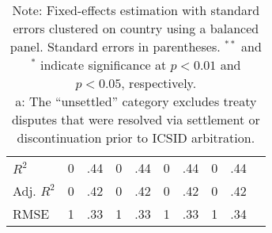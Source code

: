 \documentclass[12pt,onesided]{amsart}
\begin{document}
\begin{table}[ht]
\begin{tabular}{lr@{} lr@{}lr@{}lr@{}lr@{}}
  $R^{2}$ & 0&.44 & 0&.44 & 0&.44 & 0&.44 \\ 
  Adj. $R^{2}$ & 0&.42 & 0&.42 & 0&.42 & 0&.42 \\ 
  RMSE & 1&.33 & 1&.33 & 1&.33 & 1&.34 \\ 
   \hline
\hline
\end{tabular}
\caption*{Note: Fixed-effects estimation with standard errors clustered on country using a balanced panel. Standard errors in parentheses. $^{**}$ and $^{*}$ indicate significance at $p<0.01$ and $p<0.05$, respectively. \\ a: The ``unsettled'' category excludes treaty disputes that were resolved via settlement or discontinuation prior to ICSID arbitration.}
\end{table}

\newpage

\end{document}
